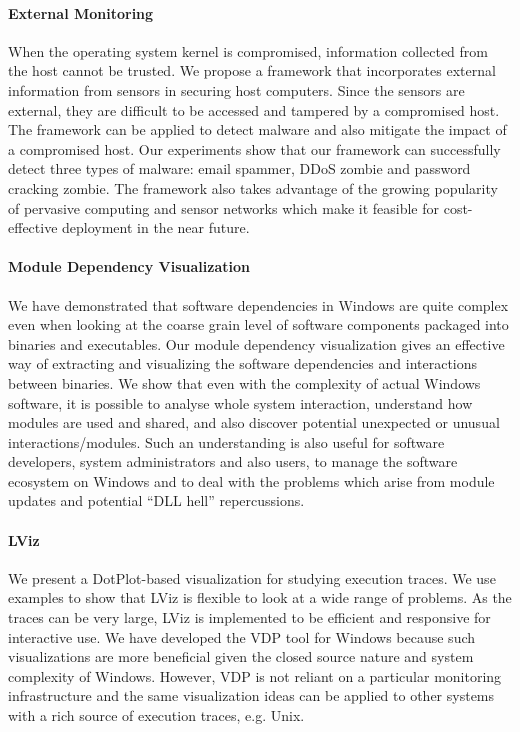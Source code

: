 \paragraph{External Monitoring}
When the operating system kernel is compromised, information collected
from the host cannot be trusted.
We propose a framework that incorporates external information from sensors in
securing host computers.
Since the sensors are external, they are difficult to be
accessed and tampered by a compromised host.
The framework can be applied to detect malware and also mitigate the
impact of a compromised host.
Our experiments show that our framework can successfully detect
three types of malware: email spammer, DDoS zombie and password cracking
zombie.
The framework also takes advantage of the growing popularity of
pervasive computing and sensor networks which make it
feasible for cost-effective deployment in the near future.

\paragraph{Module Dependency Visualization}
We have demonstrated that software dependencies in Windows are quite
complex even when looking at the coarse grain level of software components
packaged into binaries and executables.
Our module dependency visualization gives an effective way of extracting and
visualizing the software dependencies and interactions between binaries.
We show that even with the complexity of actual Windows software,
it is possible to analyse whole system interaction,
understand how modules are used and shared,
and also discover potential unexpected or unusual interactions/modules.
Such an understanding is also useful for software developers,
system administrators and also users, to manage the
software ecosystem on Windows and to deal with the problems which arise
from module updates and potential ``DLL hell'' repercussions.

\paragraph{LViz}
We present a DotPlot-based visualization for studying execution traces.
We use examples to show that LViz is flexible to look at a wide range
of problems.
As the traces can be very large, LViz is implemented to be efficient
and responsive for interactive use.
We have developed the VDP tool for Windows because such visualizations
are more beneficial given the closed source nature and system complexity
of Windows.
However, VDP is not reliant on a particular monitoring
infrastructure and the same visualization ideas can be applied
to other systems with a rich source of execution traces, e.g. Unix.

